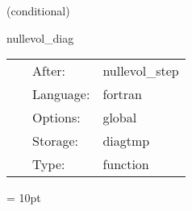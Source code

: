\vspace{5mm}

   (conditional) 

\hspace{5mm} nullevol\_diag 

\hspace{5mm}{\it diagnostics of the characteristic code } 


\hspace{5mm}

 \begin{tabular*}{160mm}{cll} 
~ & After:  & nullevol\_step \\ 
~ & Language:  & fortran \\ 
~ & Options:  & global \\ 
~ & Storage:  & diagtmp \\ 
~ & Type:  & function \\ 
\end{tabular*} 



\vspace{5mm}\parskip = 10pt 
